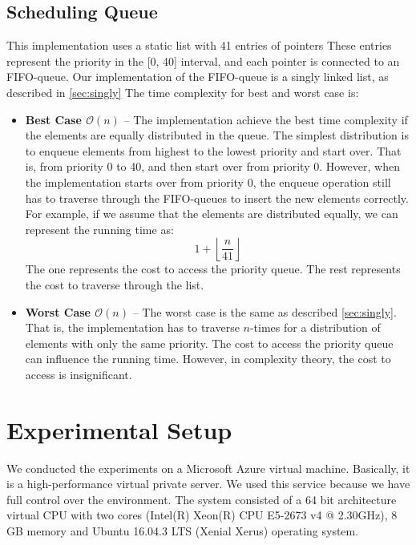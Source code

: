 \documentclass[a4paper,11pt]{kth-mag}
\newcommand\floor[1]{\lfloor#1\rfloor}
\begin{document}
\subsection{Scheduling Queue}
This implementation uses a static list with 41 entries of pointers
These entries represent the priority in the [0, 40] interval, and each pointer is connected to an FIFO-queue.
Our implementation of the FIFO-queue is a singly linked list, as described in \cref{sec:singly}
The time complexity for best and worst case is:
\begin{itemize}
    \item \textbf{Best Case $\mathcal{O}(n)$} -- The implementation achieve the best time complexity if the elements are equally distributed in the queue.
        The simplest distribution is to enqueue elements from highest to the lowest priority and start over.
        That is, from priority 0 to 40, and then start over from priority 0.
        However, when the implementation starts over from priority 0, the enqueue operation still has to traverse through the FIFO-queues to insert the new elements correctly.
        For example, if we assume that the elements are distributed equally, we can represent the running time as:
        \begin{equation*}
            1 + \left\floor{\frac{n}{41}\right}
        \end{equation*}
        The one represents the cost to access the priority queue.
        The rest represents the cost to traverse through the list.
    \item \textbf{Worst Case $\mathcal{O}(n)$} -- The worst case is the same as described \cref{sec:singly}.
        That is, the implementation has to traverse $n$-times for a distribution of elements with only the same priority.
        The cost to access the priority queue can influence the running time.
        However, in complexity theory, the cost to access is insignificant.
\end{itemize}



\section{Experimental Setup}
We conducted the experiments on a Microsoft Azure virtual machine.
Basically, it is a high-performance virtual private server.
We used this service because we have full control over the environment.
The system consisted of a 64 bit architecture virtual CPU with two cores (Intel(R) Xeon(R) CPU E5-2673 v4 @ 2.30GHz), 8 GB memory and Ubuntu 16.04.3 LTS (Xenial Xerus) operating system.
\end{document}
